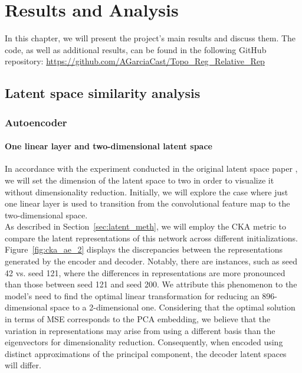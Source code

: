 \documentclass[../main.tex]{subfiles}
\begin{document}
\chapter{Results and Analysis}
\label{ch:resultsAndAnalysis}


In this chapter, we will present the project's main results and discuss them. The code, as well as additional results, can be found in the following GitHub repository: \url{https://github.com/AGarciaCast/Topo_Reg_Relative_Rep}


\section{Latent space similarity analysis}
\label{sec:res_lat}
\subsection{Autoencoder}
\subsubsection*{One linear layer and two-dimensional latent space}

In accordance with the experiment conducted in the original latent space paper \cite{moschella_relative_2022}, we will set the dimension of the latent space to two in order to visualize it without dimensionality reduction. Initially, we will explore the case where just one linear layer is used to transition from the convolutional feature map to the two-dimensional space.\\

As described in Section~\ref{sec:latent_meth}, we will employ the CKA metric to compare the latent representations of this network across different initializations. Figure~\ref{fig:cka_ae_2} displays the discrepancies between the representations generated by the encoder and decoder. Notably, there are instances, such as seed 42 vs. seed 121, where the differences in representations are more pronounced than those between seed 121 and seed 200. We attribute this phenomenon to the model's need to find the optimal linear transformation for reducing an 896-dimensional space to a 2-dimensional one. Considering that the optimal solution in terms of MSE corresponds to the PCA embedding, we believe that the variation in representations may arise from using a different basis than the eigenvectors for dimensionality reduction. Consequently, when encoded using distinct approximations of the principal component, the decoder latent spaces will differ.\\
\end{document}

